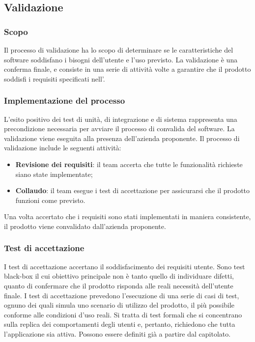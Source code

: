 \subsection{Validazione}\label{validazione}

\subsubsection{Scopo}
\par Il processo di validazione ha lo scopo di determinare se le caratteristiche del software soddisfano i bisogni dell'utente e l’uso previsto. La validazione è una conferma finale, e consiste in una serie di attività volte a garantire che il prodotto soddisfi i requisiti specificati nell’\AnalisiDeiRequisiti.

\subsubsection{Implementazione del processo}
\par L’esito positivo dei test di unità, di integrazione e di sistema rappresenta una precondizione necessaria per avviare il processo di convalida del software. La validazione viene eseguita alla presenza dell'azienda proponente. Il processo di validazione include le seguenti attività:
\begin{itemize}
  \item \textbf{Revisione dei requisiti}: il team accerta che tutte le funzionalità richieste siano state implementate;
  \item \textbf{Collaudo}: il team esegue i test di accettazione per assicurarsi che il prodotto funzioni come previsto.
\end{itemize}

\vspace{0.5\baselineskip}
\par Una volta accertato che i requisiti sono stati implementati in maniera consistente, il prodotto viene convalidato dall’azienda proponente.

\subsubsection{Test di accettazione}
\par I test di accettazione accertano il soddisfacimento dei requisiti utente. Sono test black-box il cui obiettivo principale non è tanto quello di individuare difetti, quanto di confermare che il prodotto risponda alle reali necessità dell’utente finale. I test di accettazione prevedono l’esecuzione di una serie di casi di test, ognuno dei quali simula uno scenario di utilizzo del prodotto, il più possibile conforme alle condizioni d’uso reali. Si tratta di test formali che si concentrano sulla replica dei comportamenti degli utenti e, pertanto, richiedono che tutta l'applicazione sia attiva. Possono essere definiti già a partire dal capitolato.
